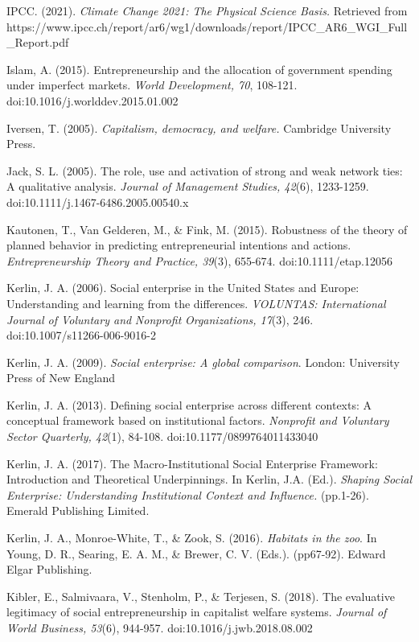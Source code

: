 \documentclass{article}
\begin{document}
IPCC. (2021). \emph{Climate Change 2021: The Physical Science Basis. }Retrieved from https://www.ipcc.ch/report/ar6/wg1/downloads/report/IPCC\_AR6\_WGI\_Full\_Report.pdf

Islam, A. (2015). Entrepreneurship and the allocation of government spending under imperfect markets. \emph{World Development, 70}, 108-121. doi:10.1016/j.worlddev.2015.01.002

Iversen, T. (2005). \emph{Capitalism, democracy, and welfare.} Cambridge University Press.

Jack, S. L. (2005). The role, use and activation of strong and weak network ties: A qualitative analysis. \emph{Journal of Management Studies, 42}(6), 1233-1259. doi:10.1111/j.1467-6486.2005.00540.x

Kautonen, T., Van Gelderen, M., \& Fink, M. (2015). Robustness of the theory of planned behavior in predicting entrepreneurial intentions and actions. \emph{Entrepreneurship Theory and Practice, 39}(3), 655-674. doi:10.1111/etap.12056

Kerlin, J. A. (2006). Social enterprise in the United States and Europe: Understanding and learning from the differences. \emph{VOLUNTAS: International Journal of Voluntary and }\emph{Nonprofit}\emph{ Organizations, 17}(3), 246. doi:10.1007/s11266-006-9016-2

Kerlin, J. A. (2009). \emph{Social enterprise: A global comparison}. London: University Press of New England

Kerlin, J. A. (2013). Defining social enterprise across different contexts: A conceptual framework based on institutional factors. \emph{Nonprofit}\emph{ and Voluntary Sector Quarterly, 42}(1), 84-108. doi:10.1177/0899764011433040

Kerlin, J. A. (2017). The Macro-Institutional Social Enterprise Framework: Introduction and Theoretical Underpinnings. In Kerlin, J.A. (Ed.). \emph{Shaping Social }\emph{Enterprise: Understanding Institutional Context and Influence. }(pp.1-26). Emerald Publishing Limited.

Kerlin, J. A., Monroe-White, T., \& Zook, S. (2016). \emph{Habitats in the zoo}. In Young, D. R., Searing, E. A. M., \& Brewer, C. V. (Eds.). (pp67-92). Edward Elgar Publishing.

Kibler, E., Salmivaara, V., Stenholm, P., \& Terjesen, S. (2018). The evaluative legitimacy of social entrepreneurship in capitalist welfare systems. \emph{Journal of World Business, 53}(6), 944-957. doi:10.1016/j.jwb.2018.08.002
\end{document}
